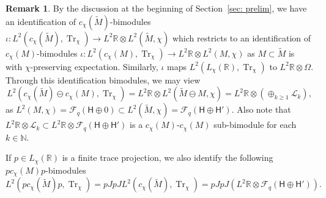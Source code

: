 \documentclass[a4paper,11pt]{amsart}
\theoremstyle{definition}
\newtheorem{rem}[thm]{Remark}
\newcommand{\N}{{\mathbb N}}
\newcommand{\R}{{\mathbb R}}
\newcommand{\cF}{{\mathcal F}}
\newcommand{\cL}{{\mathcal L}}
\newcommand{\sH}{\mathsf{H}}
\newcommand{\Tr}{\operatorname{Tr}}
\newcommand{\ot}{\otimes}
\begin{document}
\begin{rem}\label{rem: bimod identify}
By the discussion at the beginning of Section~\ref{sec: prelim}, we have an identification of $c_\chi(\tilde M)$-bimodules
	$\iota: L^2(c_\chi(\tilde M), \Tr_\chi)\to L^2\R\ot L^2(\tilde M,\chi)$
	which restricts to an identification of $c_\chi(M)$-bimodules
	$\iota: L^2(c_\chi(M),\Tr_\chi)\to L^2\R\ot L^2(M,\chi)$ as $M\subset \tilde M$ is with $\chi$-preserving expectation.
Similarly, $\iota$ maps $L^2(L_\chi(\R),\Tr_\chi)$ to $L^2\R\ot \Omega$.
Through this identification bimodules, we may view
$$
L^2(c_\chi(\tilde M) \ominus c_\chi(M),\Tr_\chi)=L^2\R\ot L^2(\tilde M\ominus M, \chi)=L^2\R\ot (\oplus_{k\geq 1} \cL_k),
$$
as $L^2(M,\chi)=\cF_q(\sH\oplus 0)\subset L^2(\tilde M,\chi)=\cF_q(\sH\oplus \sH')$.
Also note that $L^2\R\ot \cL_k\subset L^2\R\ot \cF_q(\sH\oplus \sH')$ is a $c_\chi(M)$-$c_\chi(M)$ sub-bimodule for each $k\in \N$.

If $p\in L_\chi(\R)$ is a finite trace projection, we also identify the following $pc_\chi(M)p$-bimodules
$$
L^2(pc_\chi(\tilde M)p, \Tr_\chi)=pJpJ L^2(c_\chi(\tilde M),\Tr_\chi)=pJpJ (L^2\R\ot \cF_q(\sH\oplus\sH')).
$$

\end{rem}
\end{document}
